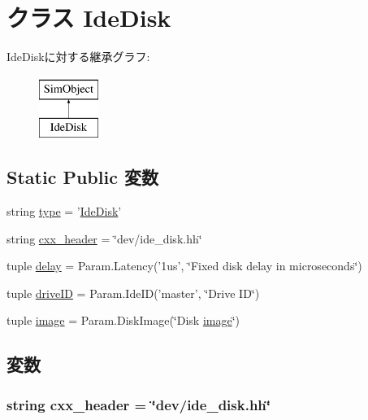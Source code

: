 \hypertarget{classIde_1_1IdeDisk}{
\section{クラス IdeDisk}
\label{classIde_1_1IdeDisk}
}
IdeDiskに対する継承グラフ:\begin{figure}[H]
\begin{center}
\leavevmode
\includegraphics[height=2cm]{classIde_1_1IdeDisk}
\end{center}
\end{figure}
\subsection*{Static Public 変数}
\begin{DoxyCompactItemize}
\item 
string \hyperlink{classIde_1_1IdeDisk_acce15679d830831b0bbe8ebc2a60b2ca}{type} = '\hyperlink{classIde_1_1IdeDisk}{IdeDisk}'
\item 
string \hyperlink{classIde_1_1IdeDisk_a17da7064bc5c518791f0c891eff05fda}{cxx\_\-header} = \char`\"{}dev/ide\_\-disk.hh\char`\"{}
\item 
tuple \hyperlink{classIde_1_1IdeDisk_ac1ab55b34347f0110eb273c9d47d52e2}{delay} = Param.Latency('1us', \char`\"{}Fixed disk delay in microseconds\char`\"{})
\item 
tuple \hyperlink{classIde_1_1IdeDisk_a4f6e363c9347706a2256af613a15687c}{driveID} = Param.IdeID('master', \char`\"{}Drive ID\char`\"{})
\item 
tuple \hyperlink{classIde_1_1IdeDisk_a19b24a8d47d783aaa13170884d6a25c2}{image} = Param.DiskImage(\char`\"{}Disk \hyperlink{classIde_1_1IdeDisk_a19b24a8d47d783aaa13170884d6a25c2}{image}\char`\"{})
\end{DoxyCompactItemize}


\subsection{変数}
\hypertarget{classIde_1_1IdeDisk_a17da7064bc5c518791f0c891eff05fda}{
\subsubsection[{cxx\_\-header}]{\setlength{\rightskip}{0pt plus 5cm}string {\bf cxx\_\-header} = \char`\"{}dev/ide\_\-disk.hh\char`\"{}}}
\label{classIde_1_1IdeDisk_a17da7064bc5c518791f0c891eff05fda}


